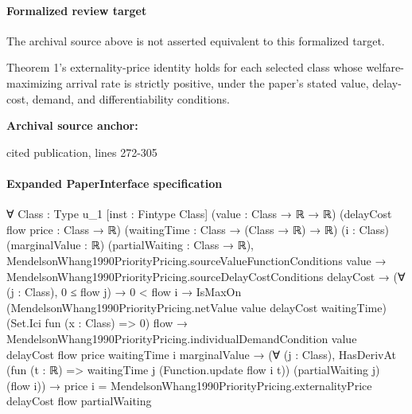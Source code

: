 \documentclass[10pt]{article}
\begin{document}
\paragraph{Formalized review target}
The archival source above is not asserted equivalent to this formalized target.
\begin{ReviewVerbatim}
Theorem 1's externality-price identity holds for each selected class whose welfare-maximizing arrival rate is strictly positive, under the paper's stated value, delay-cost, demand, and differentiability conditions.
\end{ReviewVerbatim}

\textbf{Archival source anchor:} {\footnotesize\raggedright cited publication, lines 272-\allowbreak{}305\par}
\paragraph{Expanded PaperInterface specification}
\begin{ReviewVerbatim}
∀ {Class : Type u_1} [inst : Fintype Class] (value : Class → ℝ → ℝ) (delayCost flow price : Class → ℝ)
  (waitingTime : Class → (Class → ℝ) → ℝ) (i : Class) (marginalValue : ℝ) (partialWaiting : Class → ℝ),
  MendelsonWhang1990PriorityPricing.sourceValueFunctionConditions value →
    MendelsonWhang1990PriorityPricing.sourceDelayCostConditions delayCost →
      (∀ (j : Class), 0 ≤ flow j) →
        0 < flow i →
          IsMaxOn (MendelsonWhang1990PriorityPricing.netValue value delayCost waitingTime)
              (Set.Ici fun (x : Class) => 0) flow →
            MendelsonWhang1990PriorityPricing.individualDemandCondition value delayCost flow price waitingTime i
                marginalValue →
              (∀ (j : Class),
                  HasDerivAt (fun (t : ℝ) => waitingTime j (Function.update flow i t)) (partialWaiting j) (flow i)) →
                price i = MendelsonWhang1990PriorityPricing.externalityPrice delayCost flow partialWaiting
\end{ReviewVerbatim}
\end{document}
